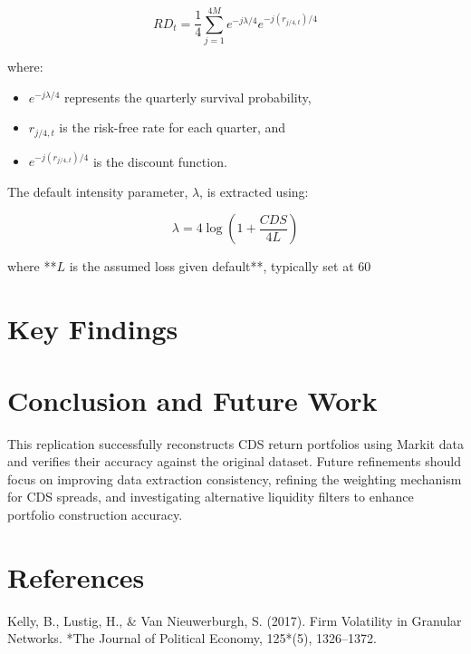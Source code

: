 \documentclass{article}
\begin{document}
\begin{equation}
    RD_t = \frac{1}{4} \sum_{j=1}^{4M} e^{-j\lambda/4} e^{-j(r_{j/4,t})/4}
\end{equation}

where:
\begin{itemize}
    \item $e^{-j\lambda/4}$ represents the quarterly survival probability,
    \item $r_{j/4,t}$ is the risk-free rate for each quarter, and
    \item $e^{-j(r_{j/4,t})/4}$ is the discount function.
\end{itemize}

The default intensity parameter, $\lambda$, is extracted using:

\begin{equation}
    \lambda = 4 \log \left(1 + \frac{CDS}{4L} \right)
\end{equation}

where **$L$ is the assumed loss given default**, typically set at 60%

\section{Key Findings}

\section{Conclusion and Future Work}

This replication successfully reconstructs CDS return portfolios using Markit data and verifies their accuracy against the original dataset. Future refinements should focus on improving data extraction consistency, refining the weighting mechanism for CDS spreads, and investigating alternative liquidity filters to enhance portfolio construction accuracy.

\section{References}
Kelly, B., Lustig, H., \& Van Nieuwerburgh, S. (2017). Firm Volatility in Granular Networks. *The Journal of Political Economy, 125*(5), 1326–1372.  
\end{document}
